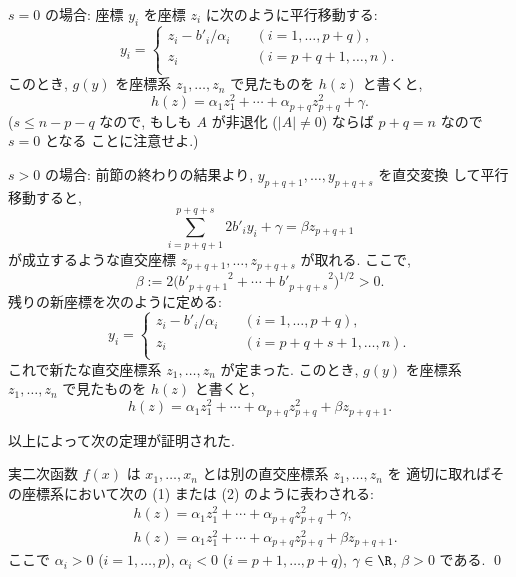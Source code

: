 \documentclass[12pt,twoside]{jarticle}
\begin{document}
\medskip
\noindent
$s=0$ の場合: 座標 $y_i$ を座標 $z_i$ に次のように平行移動する:
\begin{equation*}
  y_i =
  \begin{cases}
    z_i - b'_i/\alpha_i \quad & (i=1,\dots,p+q), \\
    z_i                 \quad & (i=p+q+1,\dots,n). \\
  \end{cases}
\end{equation*}
このとき, $g(y)$ を座標系 $z_1,\dots,z_n$ で見たものを $h(z)$ と書くと, 
\begin{equation*}
  h(z) = \alpha_1 z_1^2 + \cdots + \alpha_{p+q} z_{p+q}^2 + \gamma.
  \tag{1}
\end{equation*}
($s\le n-p-q$ なので, 
もしも $A$ が非退化 ($|A|\ne 0$) ならば $p+q=n$ なので $s=0$ となる
ことに注意せよ.)

\medskip
\noindent
$s>0$ の場合: 前節の終わりの結果より, $y_{p+q+1},\dots,y_{p+q+s}$ を直交変換
して平行移動すると,
\begin{equation*}
  \sum_{i=p+q+1}^{p+q+s} 2b'_i y_i + \gamma
  = \beta z_{p+q+1}
\end{equation*}
が成立するような直交座標 $z_{p+q+1},\dots,z_{p+q+s}$ が取れる.
ここで, 
\begin{equation*}
  \beta := 2\bigl({b'_{p+q+1}}^2+\cdots+{b'_{p+q+s}}^2\bigr)^{1/2} > 0.
\end{equation*}
残りの新座標を次のように定める:
\begin{equation*}
  y_i =
  \begin{cases}
    z_i - b'_i/\alpha_i \quad & (i=1,\dots,p+q), \\
    z_i                 \quad & (i=p+q+s+1,\dots,n). \\
  \end{cases}
\end{equation*}
これで新たな直交座標系 $z_1,\dots,z_n$ が定まった.
このとき, $g(y)$ を座標系 $z_1,\dots,z_n$ で見たものを $h(z)$ と書くと, 
\begin{equation*}
  h(z) = \alpha_1 z_1^2 + \cdots + \alpha_{p+q} z_{p+q}^2 + \beta z_{p+q+1}.
  \tag{2}
\end{equation*}

以上によって次の定理が証明された.

\begin{theorem}
\label{theorem:principal-axis}
  実二次函数 $f(x)$ は $x_1,\dots,x_n$ とは別の直交座標系 $z_1,\dots,z_n$ を
  適切に取ればその座標系において次の (1) または (2) のように表わされる:
  \begin{align*}
    &
    h(z) = \alpha_1 z_1^2 + \cdots + \alpha_{p+q} z_{p+q}^2 + \gamma,
    \tag{1}
    \\ &
    h(z) = \alpha_1 z_1^2 + \cdots + \alpha_{p+q} z_{p+q}^2 + \beta z_{p+q+1}.
  \tag{2}
  \end{align*}
  ここで $\alpha_i>0$ ($i=1,\dots,p$), $\alpha_i<0$ ($i=p+1,\dots,p+q$), 
  $\gamma\in\R$, $\beta>0$ である.
  \qed
\end{theorem}
\end{document}
